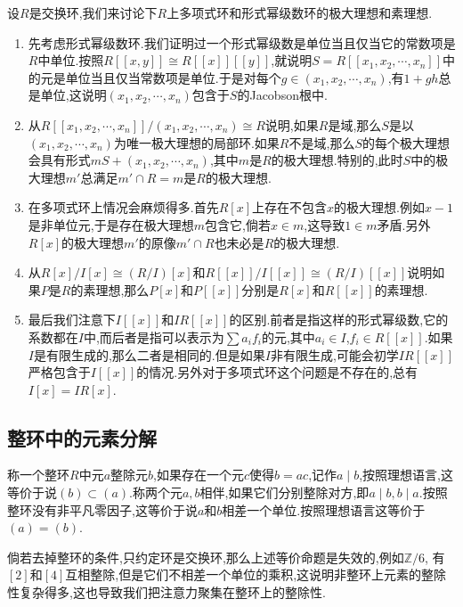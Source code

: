 设$R$是交换环,我们来讨论下$R$上多项式环和形式幂级数环的极大理想和素理想.
\begin{enumerate}
	\item 先考虑形式幂级数环.我们证明过一个形式幂级数是单位当且仅当它的常数项是$R$中单位.按照$R[[x,y]]\cong R[[x]][[y]]$,就说明$S=R[[x_1,x_2,\cdots,x_n]]$中的元是单位当且仅当常数项是单位.于是对每个$g\in(x_1,x_2,\cdots,x_n)$,有$1+gh$总是单位,这说明$(x_1,x_2,\cdots,x_n)$包含于$S$的Jacobson根中.
	\item 从$R[[x_1,x_2,\cdots,x_n]]/(x_1,x_2,\cdots,x_n)\cong R$说明,如果$R$是域,那么$S$是以$(x_1,x_2,\cdots,x_n)$为唯一极大理想的局部环.如果$R$不是域,那么$S$的每个极大理想会具有形式$mS+(x_1,x_2,\cdots,x_n)$,其中$m$是$R$的极大理想.特别的,此时$S$中的极大理想$m'$总满足$m'\cap R=m$是$R$的极大理想.
	\item 在多项式环上情况会麻烦得多.首先$R[x]$上存在不包含$x$的极大理想.例如$x-1$是非单位元,于是存在极大理想$m$包含它,倘若$x\in m$,这导致$1\in m$矛盾.另外$R[x]$的极大理想$m'$的原像$m'\cap R$也未必是$R$的极大理想.
	\item 从$R[x]/I[x]\cong(R/I)[x]$和$R[[x]]/I[[x]]\cong(R/I)[[x]]$说明如果$P$是$R$的素理想,那么$P[x]$和$P[[x]]$分别是$R[x]$和$R[[x]]$的素理想.
	\item 最后我们注意下$I[[x]]$和$IR[[x]]$的区别.前者是指这样的形式幂级数,它的系数都在$I$中,而后者是指可以表示为$\sum a_if_i$的元,其中$a_i\in I$,$f_i\in R[[x]]$.如果$I$是有限生成的,那么二者是相同的.但是如果$I$非有限生成,可能会初学$IR[[x]]$严格包含于$I[[x]]$的情况.另外对于多项式环这个问题是不存在的,总有$I[x]=IR[x]$.
\end{enumerate}
\newpage
\subsection{整环中的元素分解}

称一个整环$R$中元$a$整除元$b$,如果存在一个元$c$使得$b=ac$,记作$a\mid b$,按照理想语言,这等价于说$(b)\subset(a)$.称两个元$a,b$相伴,如果它们分别整除对方,即$a\mid b,b\mid a$.按照整环没有非平凡零因子,这等价于说$a$和$b$相差一个单位.按照理想语言这等价于$(a)=(b)$.

倘若去掉整环的条件,只约定环是交换环,那么上述等价命题是失效的,例如$\mathbb{Z}/6$, 有$[2]$和$[4]$互相整除,但是它们不相差一个单位的乘积,这说明非整环上元素的整除性复杂得多,这也导致我们把注意力聚集在整环上的整除性.

